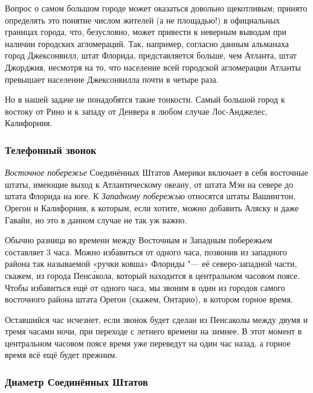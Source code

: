 \documentclass[twoside]{book}
\begin{document}
Вопрос о самом большом городе может оказаться довольно щекотливым; 
принято определять это понятие числом жителей (а не площадью!) в официальных границах города, что, безусловно, может привести к неверным выводам
при наличии городских агломераций.
Так, например, согласно данным альманаха город Джексонвилл, штат Флорида, представляется больше, чем Атланта, штат Джорджия, несмотря на то, что население всей городской агломерации Атланты превышает население Джексонвилла почти в четыре раза.


Но в нашей задаче не понадобятся такие тонкости.
Самый большой город к востоку от Рино и к западу от Денвера в любом случае Лос-Анджелес, Калифорния.
\heart

\subsubsection*{Телефонный звонок}%

\emph{Восточное побережье} Соединённых Штатов Америки включает в себя восточные штаты, имеющие выход к Атлантическому океану, от штата Мэн на севере до штата Флорида на юге.
К \emph{Западному побережью} относятся штаты Вашингтон, Орегон и Калифорния,
к которым, если хотите, можно добавить Аляску и даже Гавайи, но это в данном случае не так уж важно. %

Обычно разница во времени между Восточным и Западным побережьем составляет 3 часа.
Можно избавиться от одного часа, позвонив из западного района так называемой «ручки ковша» Флориды "--- её северо-западной части, %
скажем, из города Пенс\'{а}кола, который находится в центральном часовом поясе.
Чтобы избавиться ещё от одного часа, мы звоним в один из городов самого восточного района штата Орегон (скажем, Онтарио), в котором горное время.

Оставшийся час исчезнет, если звонок будет сделан из Пенсаколы между двумя и тремя часами ночи, при переходе с летнего времени на зимнее.
В этот момент в центральном часовом поясе время уже переведут на один час назад, а горное время всё ещё будет прежним.\heart 

       
                                  
\subsubsection*{Диаметр Соединённых Штатов}%
\end{document}
